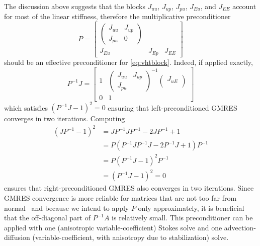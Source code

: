 The discussion above suggests that the blocks $J_{uu}$, $J_{up}$, $J_{pu}$, $J_{Eu}$, and $J_{EE}$ account for most of the linear stiffness, therefore the multiplicative preconditioner
\begin{equation}\label{eq:vht:pcnested}
  P =
  \begin{bmatrix}
    \begin{pmatrix}
      J_{uu} & J_{up} \\
      J_{pu} & 0
    \end{pmatrix} & \\
    J_{Eu} & J_{Ep} & J_{EE}
  \end{bmatrix}
\end{equation}
should be an effective preconditioner for \eqref{eq:vhtblock}.
Indeed, if applied exactly,
\begin{equation*}
  P^{-1}J =
  \begin{bmatrix}
    1 &
    \begin{pmatrix}
      J_{uu} & J_{up} \\ J_{pu} & 
    \end{pmatrix}^{-1}
    \begin{pmatrix}
      J_{uE} \\
    \end{pmatrix} \\
    0 & 1
  \end{bmatrix}
\end{equation*}
which satisfies $(P^{-1}J - 1)^2 = 0$ ensuring that left-preconditioned GMRES converges in two iterations.
Computing
\begin{align*}
  (JP^{-1} - 1)^2 & = JP^{-1}JP^{-1} - 2JP^{-1} + 1           \\
                  & = P(P^{-1}JP^{-1}J - 2P^{-1}J + 1) P^{-1} \\
                  & = P(P^{-1}J - 1)^2P^{-1}                  \\
                  & = (P^{-1}J - 1)^2 = 0
\end{align*}
ensures that right-preconditioned GMRES also converges in two iterations.
Since GMRES convergence is more reliable for matrices that are not too far from normal~\citep{nachtigal1992fnm,embree1999descriptive,trefethen2005spectra} and because we intend to apply $P$ only approximately, it is beneficial that the off-diagonal part of $P^{-1}A$ is relatively small.
This preconditioner can be applied with one (anisotropic variable-coefficient) Stokes solve and one advection-diffusion (variable-coefficient, with anisotropy due to stabilization) solve.

